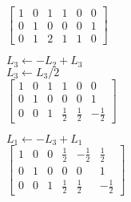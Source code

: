 \begin{exercice}
\begin{sol}
\begin{enumerate}
\begin{multicols}{2}
        \columnbreak
        $%
        \left[
          \begin{array}{rrr|rrr}
             1 & 0 & 1 & 1 & 0 & 0 \\
             0 & 1 & 0 & 0 & 0 & 1 \\
             0 & 1 & 2 & 1 & 1 & 0
          \end{array}
        \right]
        $
      \end{multicols}
      \begin{multicols}{2}
        $L_3 \leftarrow - L_2 + L_3$ \\
        $L_3 \leftarrow L_3/2$ \\
        \columnbreak
        $%
        \left[
          \begin{array}{rrr|rrr}
             1 & 0 & 1 & 1 & 0 & 0 \\
             0 & 1 & 0 & 0 & 0 & 1 \\
             0 & 0 & 1 & \frac{1}{2} &  \frac{1}{2} & -\frac{1}{2}
          \end{array}
        \right]
        $
      \end{multicols}
      \begin{multicols}{2}
        $L_1 \leftarrow - L_3 + L_1$ \\
        \columnbreak
        $%
        \left[
          \begin{array}{rrr|rrr}
             1 & 0 & 0 & \frac{1}{2} & -\frac{1}{2} &  \frac{1}{2} \\
             0 & 1 & 0 & 0 & 0 & 1 \\
             0 & 0 & 1 & \frac{1}{2} &  \frac{1}{2} & -\frac{1}{2}
          \end{array}
        \right]
        $
      \end{multicols}
    \end{enumerate}
  \end{sol}
  \begin{rep}
    \raggedright
\end{rep}
\end{exercice}
